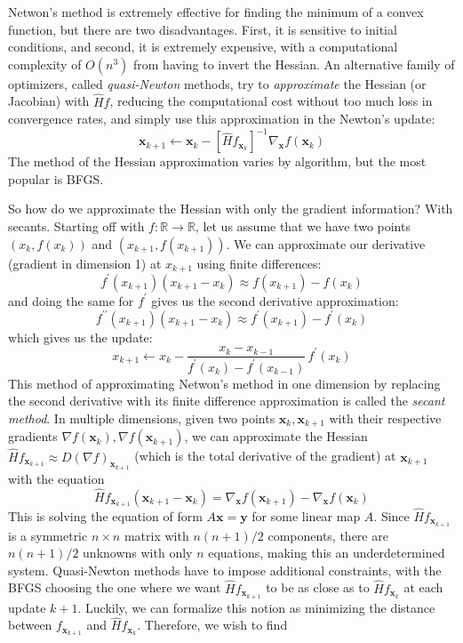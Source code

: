     Netwon's method is extremely effective for finding the minimum of a convex function, but there are two disadvantages. First, it is sensitive to initial conditions, and second, it is extremely expensive, with a computational complexity of $O(n^3)$ from having to invert the Hessian. An alternative family of optimizers, called \textit{quasi-Newton} methods, try to \textit{approximate} the Hessian (or Jacobian) with $\hat{H} f$, reducing the computational cost without too much loss in convergence rates, and simply use this approximation in the Newton's update: 
    \[\mathbf{x}_{k+1} \gets \mathbf{x}_k - [\hat{H} f_{\mathbf{x}_k}]^{-1} \nabla_\mathbf{x} f (\mathbf{x}_k)\]
    The method of the Hessian approximation varies by algorithm, but the most popular is BFGS. 

    So how do we approximate the Hessian with only the gradient information? With secants. Starting off with $f: \mathbb{R} \longrightarrow \mathbb{R}$, let us assume that we have two points $(x_k, f(x_k))$ and $(x_{k+1}, f(x_{k+1}))$. We can approximate our derivative (gradient in dimension 1) at $x_{k+1}$ using finite differences: 
    \[f^\prime (x_{k+1}) (x_{k+1} - x_k) \approx f(x_{k+1}) - f(x_k)\]
    and doing the same for $f^\prime$ gives us the second derivative approximation: 
    \[f^{\prime\prime} (x_{k+1}) (x_{k+1} - x_k) \approx f^\prime (x_{k+1}) - f^\prime (x_k)\]
    which gives us the update: 
    \[x_{k+1} \gets x_k - \frac{x_{k} - x_{k-1}}{f^\prime (x_k) - f^\prime (x_{k-1})} \, f^\prime (x_k)\]
    This method of approximating Netwon's method in one dimension by replacing the second derivative with its finite difference approximation is called the \textit{secant method}. In multiple dimensions, given two points $\mathbf{x}_k, \mathbf{x}_{k+1}$ with their respective gradients $\nabla f (\mathbf{x}_{k}), \nabla f (\mathbf{x}_{k+1})$, we can approximate the Hessian $\hat{H} f_{\mathbf{x}_{k+1}} \approx D (\nabla f)_{\mathbf{x}_{k+1}}$ (which is the total derivative of the gradient) at $\mathbf{x}_{k+1}$ with the equation
    \[\hat{H} f_{\mathbf{x}_{k+1}} (\mathbf{x}_{k+1} - \mathbf{x}_k) = \nabla_\mathbf{x} f (\mathbf{x}_{k+1}) - \nabla_\mathbf{x} f (\mathbf{x}_k)\]
    This is solving the equation of form $A \mathbf{x} = \mathbf{y}$ for some linear map $A$. Since $\hat{H} f_{\mathbf{x}_{k+1}}$ is a symmetric $n \times n$ matrix with $n (n+1) / 2$ components, there are $n (n+1) / 2$ unknowns with only $n$ equations, making this an underdetermined system. Quasi-Newton methods have to impose additional constraints, with the BFGS choosing the one where we want $\hat{H} f_{\mathbf{x}_{k+1}}$ to be as close as to $\hat{H} f_{\mathbf{x}_{k}}$ at each update $k+1$. Luckily, we can formalize this notion as minimizing the distance between $f_{\mathbf{x}_{k+1}}$ and $\hat{H} f_{\mathbf{x}_{k}}$. Therefore, we wish to find 
